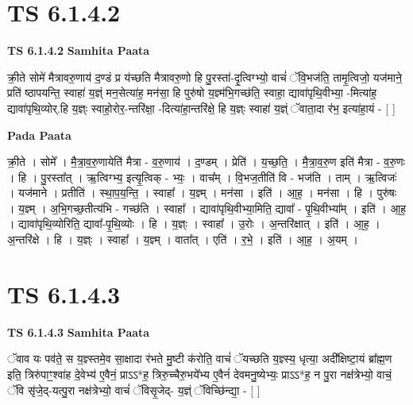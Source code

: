 \documentclass[17pt]{extarticle}
\begin{document}

\section{ TS 6.1.4.2 }

\textbf{TS 6.1.4.2 } \newline
\textbf{Samhita Paata} \newline

क्री॒ते सोमे॑ मैत्रावरु॒णाय॑ द॒ण्डं प्र य॑च्छति मैत्रावरु॒णो हि पु॒रस्ता॑-दृ॒त्विग्भ्यो॒ वाचं॑ ॅवि॒भज॑ति॒ तामृ॒त्विजो॒ यज॑माने॒ प्रति॑ ष्ठापयन्ति॒ स्वाहा॑ य॒ज्ञ्ं मन॒सेत्या॑ह॒ मन॑सा॒ हि पुरु॑षो य॒ज्ञ्म॑भि॒गच्छ॑ति॒ स्वाहा॒ द्यावा॑पृथि॒वीभ्या॒ -मित्या॑ह॒ द्यावा॑पृथि॒व्योर्.हि य॒ज्ञ्ः स्वाहो॒रोर॒-न्तरि॑क्षा॒ -दित्या॑हा॒न्तरि॑क्षे॒ हि य॒ज्ञ्ः स्वाहा॑ य॒ज्ञ्ं ॅवाता॒दा र॑भ॒ इत्या॑हा॒यं - [  ] \newline

\textbf{Pada Paata} \newline

क्री॒ते । सोमे᳚ । मै॒त्रा॒व॒रु॒णायेति॑ मैत्रा - व॒रु॒णाय॑ । द॒ण्डम् । प्रेति॑ । य॒च्छ॒ति॒ । मै॒त्रा॒व॒रु॒ण इति॑ मैत्रा - व॒रु॒णः । हि । पु॒रस्ता᳚त् । ऋ॒त्विग्भ्य॒ इत्यृ॒त्विक् - भ्यः॒ । वाच᳚म् । वि॒भज॒तीति॑ वि - भज॑ति । ताम् । ऋ॒त्विजः॑ । यज॑माने । प्रतीति॑ । स्था॒प॒य॒न्ति॒ । स्वाहा᳚ । य॒ज्ञ्म् । मन॑सा । इति॑ । आ॒ह॒ । मन॑सा । हि । पुरु॑षः । य॒ज्ञ्म् । अ॒भि॒गच्छ॒तीत्य॑भि - गच्छ॑ति । स्वाहा᳚ । द्यावा॑पृथि॒वीभ्या॒मिति॒ द्यावा᳚ - पृ॒थि॒वीभ्या᳚म् । इति॑ । आ॒ह॒ । द्यावा॑पृथि॒व्योरिति॒ द्यावा᳚-पृ॒थि॒व्योः । हि । य॒ज्ञ्ः । स्वाहा᳚ । उ॒रोः । अ॒न्तरि॑क्षात् । इति॑ । आ॒ह॒ । अ॒न्तरि॑क्षे । हि । य॒ज्ञ्ः । स्वाहा᳚ । य॒ज्ञ्म् । वाता᳚त् । एति॑ । र॒भे॒ । इति॑ । आ॒ह॒ । अ॒यम् ।  \newline





\section{ TS 6.1.4.3 }

\textbf{TS 6.1.4.3 } \newline
\textbf{Samhita Paata} \newline

ॅवाव यः पव॑ते॒ स य॒ज्ञ्स्तमे॒व सा॒क्षादा र॑भते मु॒ष्टी क॑रोति॒ वाचं॑ ॅयच्छति य॒ज्ञ्स्य॒ धृत्या॒ अदी᳚क्षिष्टा॒यं ब्रा᳚ह्म॒ण इति॒ त्रिरु॑पाꣳ॒॒श्वा॑ह दे॒वेभ्य॑ ए॒वैनं॒ प्राऽऽ*ह॒ त्रिरु॒च्चैरु॒भये᳚भ्य ए॒वैनं॑ देवमनु॒ष्येभ्यः॒ प्राऽऽ*ह॒ न पु॒रा नक्ष॑त्रेभ्यो॒ वाचं॒ ॅवि सृ॑जे॒द्-यत्पु॒रा नक्ष॑त्रेभ्यो॒ वाचं॑ ॅविसृ॒जेद्- य॒ज्ञ्ं ॅविच्छि॑न्द्या॒ - [  ] \newline
\end{document}
